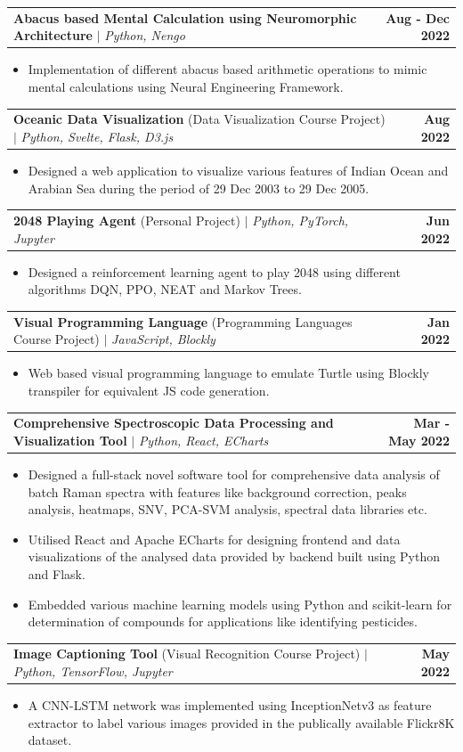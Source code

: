\documentclass[letterpaper,11pt]{article}
\makeatletter
\newcommand{\resumeItem}[1]{
  \item\small{
    {#1 \vspace{-2pt}}
  }
}
\newcommand{\resumeProjectHeading}[2]{
    \item
    \begin{tabular*}{1.001\textwidth}{l@{\extracolsep{\fill}}r}
      \small#1 & \textbf{\small #2}\\
    \end{tabular*}\vspace{-7pt}
}
\newcommand{\resumeItemListStart}{\begin{itemize}}
\newcommand{\resumeItemListEnd}{\end{itemize}\vspace{-5pt}}
\makeatother
\begin{document}
\vspace{-13pt}
\resumeProjectHeading
{\textbf{Abacus based Mental Calculation using Neuromorphic Architecture} $|$ \emph{Python, Nengo}}{Aug - Dec 2022}
\resumeItemListStart
\resumeItem{Implementation of different abacus based arithmetic operations to mimic mental calculations using Neural Engineering Framework.}
\resumeItemListEnd

\vspace{-13pt}
\resumeProjectHeading
{\textbf{Oceanic Data Visualization} (Data Visualization Course Project) $|$ \emph{Python, Svelte, Flask, D3.js}}{Aug 2022}
\resumeItemListStart
\resumeItem{Designed a web application to visualize various features of Indian Ocean and Arabian Sea during the period of 29 Dec 2003 to 29 Dec 2005.}
\resumeItemListEnd

\newpage
\resumeProjectHeading
{\textbf{2048 Playing Agent} (Personal Project) $|$ \emph{Python, PyTorch, Jupyter}}{Jun 2022}
\resumeItemListStart
\resumeItem{Designed a reinforcement learning agent to play 2048 using different algorithms DQN, PPO, NEAT and Markov Trees.}
\resumeItemListEnd

\vspace{-13pt}
\resumeProjectHeading{\textbf{Visual Programming Language} (Programming Languages Course Project) $|$ \emph{JavaScript, Blockly}}{Jan 2022}
\resumeItemListStart
\resumeItem{Web based visual programming language to emulate Turtle using Blockly transpiler for equivalent JS code generation.}
\resumeItemListEnd

\vspace{-13pt}
\resumeProjectHeading{\textbf{Comprehensive Spectroscopic Data Processing and Visualization Tool} $|$ \emph{Python, React, ECharts}}{Mar - May 2022}
\resumeItemListStart
\resumeItem{Designed a full-stack novel software tool for comprehensive data analysis of batch Raman spectra with features like background correction, peaks analysis, heatmaps, SNV, PCA-SVM analysis, spectral data libraries etc.}
\resumeItem{Utilised React and Apache ECharts for designing frontend and data visualizations of the analysed data provided by backend built using Python and Flask.}
\resumeItem{Embedded various machine learning models using Python and scikit-learn for determination of compounds for applications like identifying pesticides.}
\resumeItemListEnd

\vspace{-13pt}
\resumeProjectHeading{\textbf{Image Captioning Tool} (Visual Recognition Course Project) $|$ \emph{Python, TensorFlow, Jupyter}}{May 2022}
\resumeItemListStart
\resumeItem{A CNN-LSTM network was implemented using InceptionNetv3 as feature extractor to label various images provided in the publically available Flickr8K dataset.}
\resumeItemListEnd
\end{document}
